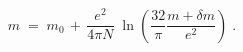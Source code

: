 \begin{equation}\label{eq:mr1}
m \;=\; m_0 \,+\, \frac{e^2}{4 \pi N} \;
\ln(\frac{32}{\pi} \frac{m + \delta m}{e^2})\;.
\end{equation}

